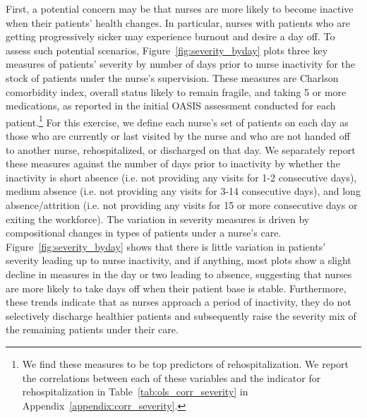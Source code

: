 \documentclass[final,12pt, notitlepage]{article}
\begin{document}
First, a potential concern may be that nurses are more likely to become inactive when their patients' health changes. In particular, nurses with patients who are getting progressively sicker may experience burnout and desire a day off. To assess such potential scenarios, Figure~\ref{fig:severity_byday} plots three key measures of patients' severity by number of days prior to nurse inactivity for the stock of patients under the nurse's supervision.
These measures are Charlson comorbidity index, overall status likely to remain fragile, and taking 5 or more medications, as reported in the initial OASIS assessment conducted for each patient.\footnote{We find these measures to be top predictors of rehospitalization. We report the correlations between each of these variables and the indicator for rehospitalization in Table~\ref{tab:ols_corr_severity} in Appendix~\ref{appendix:corr_severity}.}
For this exercise, we define each nurse's set of patients on each day as those who are currently or last visited by the nurse and who are not handed off to another nurse, rehospitalized, or discharged on that day. We separately report these measures against the number of days prior to inactivity by whether the inactivity is short absence (i.e. not providing any visits for 1-2 consecutive days), medium absence (i.e. not providing any visits for 3-14 consecutive days), and long absence/attrition (i.e. not providing any visits for 15 or more consecutive days or exiting the workforce).
The variation in severity measures is driven by compositional changes in types of patients under a nurse's care.
Figure~\ref{fig:severity_byday} shows that there is little variation in patients' severity leading up to nurse inactivity, and if anything, most plots show a slight decline in measures in the day or two leading to absence, suggesting that nurses are more likely to take days off when their patient base is stable.
Furthermore, these trends indicate that as nurses approach a period of inactivity, they do not selectively discharge healthier patients and subsequently raise the severity mix of the remaining patients under their care.
\end{document}
